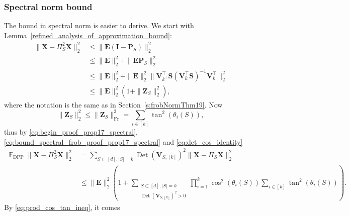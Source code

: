 \documentclass[twoside,11pt]{book}
\numberwithin{theorem}{chapter}
\numberwithin{definition}{chapter}
\numberwithin{proposition}{chapter}
\numberwithin{corollary}{chapter}
\numberwithin{example}{chapter}
\numberwithin{lemma}{chapter}
\numberwithin{assumption}{chapter}
\DeclareMathOperator{\Det}{Det}
\DeclareMathOperator{\Fr}{\mathrm{Fr}}
\DeclareMathOperator{\DPP}{\mathrm{DPP}}
\DeclareMathOperator{\Tran}{\intercal}
\DeclareMathOperator{\EX}{\mathbb{E}}
\begin{document}
\subsubsection{Spectral norm bound}
The bound in spectral norm is easier to derive.
We start with Lemma~\ref{refined_analysis_of_approximation_bound}:
\begin{equation}
\label{eq:begin_proof_prop17_spectral}
    \begin{split}
        \| \bm{X} - \Pi_{S}^{2}\bm{X} \|_{2}^{2}  & \leq  \| \bm{E}(\bm{I}-\bm{P}_{S})\|_{2}^{2}\\
        & \leq \| \bm{E}\|_{2}^{2} +  \| \bm{E}\bm{P}_{S}\|_{2}^{2}\\
        & \leq \| \bm{E}\|_{2}^{2} + \|\bm{E}\|_{2}^{2}\|\bm{V}_{k^{\perp}}^{\Tran}\bm{S}(\bm{V}_{k}^{\Tran}\bm{S})^{-1}\bm{V}_{k}^{\Tran}\|_{2}^{2}\\
        & \leq \| \bm{E}\|_{2}^{2}(1 + \|\bm{Z}_{S}\|_{2}^{2}),
    \end{split}
\end{equation}
where the notation is the same as in Section~\ref{s:frobNormThm19}.
Now
\begin{equation}\label{eq:bound_spectral_frob_proof_prop17_spectral}
                \|\bm{Z}_{S}\|_{2}^{2}  \leq  \|\bm{Z}_{S}\|_{\Fr}^{2}
                = \sum\limits_{i \in [k]} \tan^{2}(\theta_{i}(S)),
\end{equation}
thus by \eqref{eq:begin_proof_prop17_spectral}, \eqref{eq:bound_spectral_frob_proof_prop17_spectral} and \eqref{eq:det_cos_identity}
\begin{align}
    \EX_{\DPP} \| \bm{X} - \Pi_{S}^{2}\bm{X} \|_{2}^{2} &= \sum_{S \subset [d], |S| = k}\Det(\bm{V}_{S,[k]})^{2}\| \bm{X} - \Pi_{S}\bm{X} \|_{2}^{2}\\
    & \leq \| \bm{E}\|_{2}^{2} \left(1 + \sum_{\substack{S \subset [d], |S| = k\\   \Det(\bm{V}_{S,[k]})^{2}>0}} \prod\limits_{i =1}^{k} \cos^{2}(\theta_{i}(S)) \sum\limits_{i \in [k]} \tan^{2}(\theta_{i}(S)) \right).
\end{align}
By \eqref{eq:prod_cos_tan_ineq}, it comes
\end{document}
